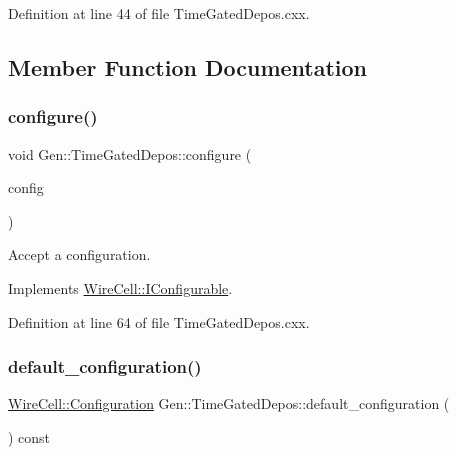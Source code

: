 Definition at line 44 of file Time\+Gated\+Depos.\+cxx.



\subsection{Member Function Documentation}
\mbox{\label{class_wire_cell_1_1_gen_1_1_time_gated_depos_a7bc3213029b51a4017ba216d0c674dc3}} 
\subsubsection{\texorpdfstring{configure()}{configure()}}
{\footnotesize\ttfamily void Gen\+::\+Time\+Gated\+Depos\+::configure (\begin{DoxyParamCaption}\item[{const \hyperlink{namespace_wire_cell_a9f705541fc1d46c608b3d32c182333ee}{Wire\+Cell\+::\+Configuration} \&}]{config }\end{DoxyParamCaption})\hspace{0.3cm}{\ttfamily [virtual]}}



Accept a configuration. 



Implements \hyperlink{class_wire_cell_1_1_i_configurable_a57ff687923a724093df3de59c6ff237d}{Wire\+Cell\+::\+I\+Configurable}.



Definition at line 64 of file Time\+Gated\+Depos.\+cxx.

\mbox{\label{class_wire_cell_1_1_gen_1_1_time_gated_depos_a7a9b90856b2e7c8c0bed942eb6c21d03}} 
\subsubsection{\texorpdfstring{default\+\_\+configuration()}{default\_configuration()}}
{\footnotesize\ttfamily \hyperlink{namespace_wire_cell_a9f705541fc1d46c608b3d32c182333ee}{Wire\+Cell\+::\+Configuration} Gen\+::\+Time\+Gated\+Depos\+::default\+\_\+configuration (\begin{DoxyParamCaption}{ }\end{DoxyParamCaption}) const\hspace{0.3cm}{\ttfamily [virtual]}}




